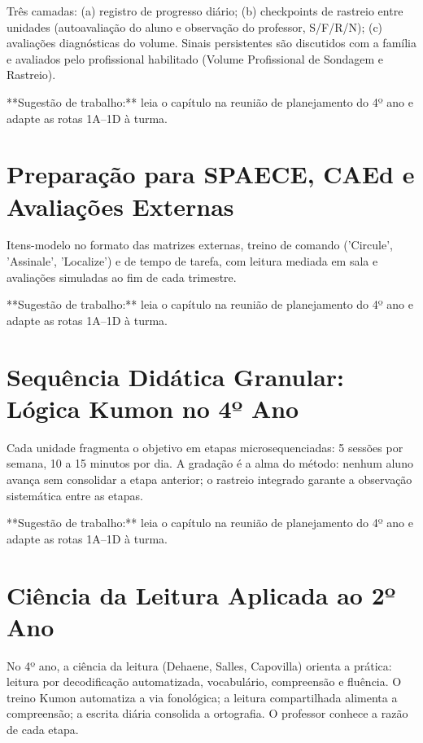 Três camadas: (a) registro de progresso diário; (b) checkpoints de rastreio entre unidades (autoavaliação do aluno e observação do professor, S/F/R/N); (c) avaliações diagnósticas do volume. Sinais persistentes são discutidos com a família e avaliados pelo profissional habilitado (Volume Profissional de Sondagem e Rastreio).


\begin{dica}
**Sugestão de trabalho:** leia o capítulo na reunião de planejamento do 4º ano e adapte as rotas 1A–1D à turma.
\end{dica}

\chapter{Preparação para SPAECE, CAEd e Avaliações Externas}

Itens-modelo no formato das matrizes externas, treino de comando ('Circule', 'Assinale', 'Localize') e de tempo de tarefa, com leitura mediada em sala e avaliações simuladas ao fim de cada trimestre.


\begin{dica}
**Sugestão de trabalho:** leia o capítulo na reunião de planejamento do 4º ano e adapte as rotas 1A–1D à turma.
\end{dica}

\chapter{Sequência Didática Granular: Lógica Kumon no 4º Ano}

Cada unidade fragmenta o objetivo em etapas microsequenciadas: 5 sessões por semana, 10 a 15 minutos por dia. A gradação é a alma do método: nenhum aluno avança sem consolidar a etapa anterior; o rastreio integrado garante a observação sistemática entre as etapas.


\begin{dica}
**Sugestão de trabalho:** leia o capítulo na reunião de planejamento do 4º ano e adapte as rotas 1A–1D à turma.
\end{dica}

\chapter{Ciência da Leitura Aplicada ao 2º Ano}

No 4º ano, a ciência da leitura (Dehaene, Salles, Capovilla) orienta a prática: leitura por decodificação automatizada, vocabulário, compreensão e fluência. O treino Kumon automatiza a via fonológica; a leitura compartilhada alimenta a compreensão; a escrita diária consolida a ortografia. O professor conhece a razão de cada etapa.


